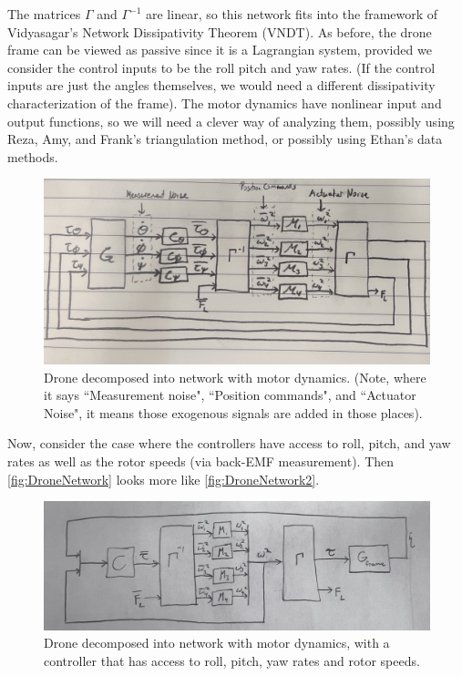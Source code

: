 \documentclass[10pt]{article}
\theoremstyle{definition}
\begin{document}
The matrices $\Gamma$ and $\Gamma^{-1}$ are linear, so this network fits into the framework of Vidyasagar's Network Dissipativity Theorem (VNDT). As before, the drone frame can be viewed as passive since it is a Lagrangian system, provided we consider the control inputs to be the roll pitch and yaw rates. (If the control inputs are just the angles themselves, we would need a different dissipativity characterization of the frame). The motor dynamics have nonlinear input and output functions, so we will need a clever way of analyzing them, possibly using Reza, Amy, and Frank's triangulation method, or possibly using Ethan's data methods.

\begin{figure}
	\centering
	\includegraphics[width=.8\textwidth]{DroneNetwork}
	\caption{Drone decomposed into network with motor dynamics. (Note, where it says ``Measurement noise", ``Position commands", and ``Actuator Noise", it means those exogenous signals are added in those places).} \label{fig:DroneNetwork}
\end{figure}

Now, consider the case where the controllers have access to roll, pitch, and yaw rates as well as the rotor speeds (via back-EMF measurement). Then \autoref{fig:DroneNetwork} looks more like \autoref{fig:DroneNetwork2}.

\begin{figure}
	\centering
	\includegraphics[width=.8\textwidth]{DroneNetwork2}
	\caption{Drone decomposed into network with motor dynamics, with a controller that has access to roll, pitch, yaw rates and rotor speeds.} \label{fig:DroneNetwork2}
\end{figure}
\end{document}
